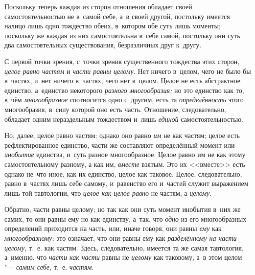 Поскольку теперь каждая из сторон отношения обладает своей
самостоятельностью не в~самой себе, а~в своей другой, постольку имеется
налицо лишь одно тождество обеих, в~котором обе суть лишь моменты;
поскольку же каждая из них самостоятельна в~себе самой, постольку они суть
два самостоятельных существования, безразличных друг к~другу.

С первой точки зрения, с~точки зрения существенного тождества этих сторон,
{\em целое равно частям} и {\em части равны целому}. Нет ничего в~целом, чего
не было бы в~частях, и~нет ничего в~частях, чего нет в~целом. Целое не есть
абстрактное единство, а~единство некоторого
{\em разного многообразия;} но это единство как то, в~чём
{\em многообразное} соотносится одно с~другим, есть
та {\em определённость} этого многообразия, в~силу
которой оно есть часть. Отношение, следовательно, обладает одним
нераздельным тождеством и~лишь {\em единой} самостоятельностью.

Но, далее, целое равно частям; однако оно равно {\em им}
не как частям; целое есть рефлектированное единство, части же составляют
определённый момент или {\em инобытие} единства, и~суть
разное многообразное. Целое равно им не как этому самостоятельному разному,
а как им, {\em вместе} взятым. Это их <<вместе>> есть
однако не~что иное, как их единство, целое как таковое. Целое,
следовательно, равно в~частях лишь себе самому, и~равенство его и~частей
служит выражением лишь той тавтологии, что {\em целое
как целое равно} не частям, а {\em целому}.

Обратно, части равны целому; но так как они суть момент инобытия в~них же
самих, то они равны ему но как единству, а~так, что
{\em одно} из его многообразных определений приходится
на часть, или, иначе говоря, они равны {\em ему} как
{\em многообразному;} это означает, что они равны ему
как {\em разделённому на части целому,} т.~е. как
частям. Здесь, следовательно, имеется та же самая тавтология, а~именно, что
{\em части как части} равны не {\em целому} как таковому, а~в этом целом
"--- {\em самим себе,} т.~е. {\em частям}.

